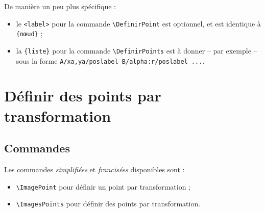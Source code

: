 \documentclass[french,a4paper,11pt]{article}
\newcommand\cmaj[1]{\tcbox[vignetteMaJ]{#1}\xspace}
\begin{document}
\begin{tipblock}
De manière un peu plus spécifique :

\begin{itemize}
	\item le \texttt{<label>} pour la commande \texttt{\textbackslash DefinirPoint} est optionnel, et est identique à \texttt{\{nœud\}} ;
	\item la \texttt{\{liste\}} pour la commande \texttt{\textbackslash DefinirPoints} est à donner -- par exemple -- sous la forme \texttt{A/xa,ya/poslabel B/alpha:r/poslabel ...}.
\end{itemize}
\vspace*{-\baselineskip}\leavevmode
\end{tipblock}

\begin{DemoCode}[]
\end{DemoCode}

\begin{DemoCode}[]
\end{DemoCode}

\pagebreak

\section{Définir des points par transformation}

\subsection{Commandes}

\begin{cautionblock}
\cmaj{0.1.1} Les commandes \textit{simplifiées} et \textit{francisées} disponibles sont :

\begin{itemize}
	\item \texttt{\textbackslash ImagePoint} pour définir un point par transformation ;
	\item \texttt{\textbackslash ImagesPoints} pour définir des points par transformation.
\end{itemize}
\vspace*{-\baselineskip}\leavevmode
\end{cautionblock}
\end{document}
